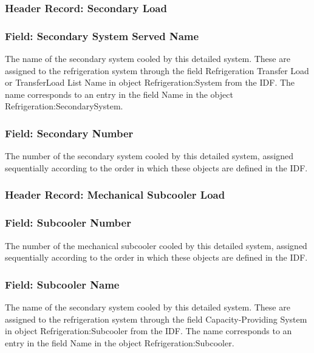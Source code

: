 \subsubsection{Header Record: Secondary Load}\label{header-record-secondary-load}

\subsubsection{Field: Secondary System Served Name}\label{field-secondary-system-served-name}

The name of the secondary system cooled by this detailed system. These are assigned to the refrigeration system through the field Refrigeration Transfer Load or TransferLoad List Name in object Refrigeration:System from the IDF. The name corresponds to an entry in the field Name in the object Refrigeration:SecondarySystem.

\subsubsection{Field: Secondary Number}\label{field-secondary-number}

The number of the secondary system cooled by this detailed system, assigned sequentially according to the order in which these objects are defined in the IDF.

\subsubsection{Header Record: Mechanical Subcooler Load}\label{header-record-mechanical-subcooler-load}

\subsubsection{Field: Subcooler Number}\label{field-subcooler-number}

The number of the mechanical subcooler cooled by this detailed system, assigned sequentially according to the order in which these objects are defined in the IDF.

\subsubsection{Field: Subcooler Name}\label{field-subcooler-name}

The name of the secondary system cooled by this detailed system. These are assigned to the refrigeration system through the field Capacity-Providing System in object Refrigeration:Subcooler from the IDF. The name corresponds to an entry in the field Name in the object Refrigeration:Subcooler.

